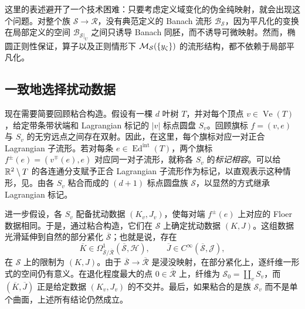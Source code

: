 \begin{note}\label{st:9.4}
这里的表述避开了一个技术困难：只要考虑定义域变化的伪全纯映射，就会出现这个问题。对整个族 $\mathcal S\to\mathcal R$，没有典范定义的 Banach 流形 $\mathcal B_{\mathcal S}$，因为平凡化的变换在局部定义的空间 $\mathcal B_{\mathcal S|_U}$ 之间只诱导 Banach 同胚，而不诱导可微映射。然而，椭圆正则性保证，算子以及正则情形下 $\mathcal M_{\mathcal S}(\{y_\zeta\})$ 的流形结构，都不依赖于局部平凡化。
\end{note}

\subsection{一致地选择扰动数据}\label{sec:9i}
现在需要简要回顾粘合构造。假设有一棵 $d$ 叶树 $T$，并对每个顶点 $v\in\operatorname{Ve}(T)$，给定带条带状端和 Lagrangian 标记的 $|v|$ 标点圆盘 $S_v$。回顾旗标 $f=(v,e)$ 与 $S_v$ 的无穷远点之间存在双射。因此，在这里，每个旗标对应一对正合 Lagrangian 子流形。若对每条 $e\in\operatorname{Ed}^{\mathrm{int}}(T)$，两个旗标 $f^\pm(e)=(v^\mp(e),e)$ 对应同一对子流形，就称各 $S_v$ 的\emph{标记相容}。可以给 $\mathbb R^2\setminus T$ 的各连通分支赋予正合 Lagrangian 子流形作为标记，以直观表示这种情形，见。由各 $S_v$ 粘合而成的 $(d+1)$ 标点圆盘族 $\mathcal S$，以显然的方式继承 Lagrangian 标记。

进一步假设，各 $S_v$ 配备扰动数据 $(K_v,J_v)$，使每对端 $f^\pm(e)$ 上对应的 Floer 数据相同。于是，通过粘合构造，它们在 $\mathcal S$ 上确定扰动数据 $(K,J)$。这组数据光滑延伸到自然的部分紧化 $\overline{\mathcal S}$；也就是说，存在
\begin{equation}\label{eq:9.19}
\overline K\in\Omega^1_{\overline{\mathcal S}/\overline{\mathcal R}}(\overline{\mathcal S},\mathcal H),\qquad
\overline J\in C^\infty(\overline{\mathcal S},\mathcal J),
\end{equation}
在 $\mathcal S$ 上的限制为 $(K,J)$。由于 $\overline{\mathcal S}\to\overline{\mathcal R}$ 是浸没映射，在部分紧化上，逐纤维一形式的空间仍有意义。在退化程度最大的点 $0\in\overline{\mathcal R}$ 上，纤维为 $\mathcal S_0=\coprod_vS_v$，而 $(\overline K,\overline J)$ 正是给定数据 $(K_v,J_v)$ 的不交并。最后，如果粘合的是族 $\mathcal S_v$ 而不是单个曲面，上述所有结论仍然成立。

